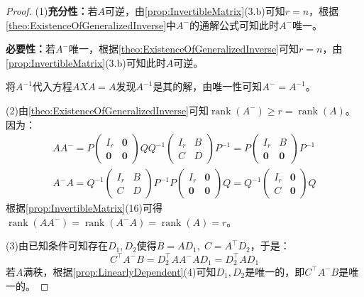 \begin{proof}
	(1)\textbf{充分性：}若$A$可逆，由\cref{prop:InvertibleMatrix}(3.b)可知$r=n$，根据\cref{theo:ExistenceOfGeneralizedInverse}中$A^-$的通解公式可知此时$A^-$唯一。\par
	\textbf{必要性：}若$A^-$唯一，根据\cref{theo:ExistenceOfGeneralizedInverse}可知$r=n$，由\cref{prop:InvertibleMatrix}(3.b)可知此时$A$可逆。\par
	将$A^{-1}$代入方程$AXA=A$发现$A^{-1}$是其的解，由唯一性可知$A^{-}=A^{-1}$。\par
	(2)由\cref{theo:ExistenceOfGeneralizedInverse}可知$\operatorname{rank}(A^-)\geqslant r=\operatorname{rank}(A)$。因为：
	\begin{gather*}
		AA^-=P
		\begin{pmatrix}
			I_r & \mathbf{0} \\
			\mathbf{0} & \mathbf{0}
		\end{pmatrix}
		QQ^{-1}
		\begin{pmatrix}
			I_r & B \\
			C & D
		\end{pmatrix}
		P^{-1}
		=P
		\begin{pmatrix}
			I_r & B \\
			\mathbf{0} & \mathbf{0}
		\end{pmatrix}
		P^{-1} \\
		A^-A=Q^{-1}
		\begin{pmatrix}
			I_r & B \\
			C & D
		\end{pmatrix}
		P^{-1}P
		\begin{pmatrix}
			I_r & \mathbf{0} \\
			\mathbf{0} & \mathbf{0}
		\end{pmatrix}
		Q
		=Q^{-1}
		\begin{pmatrix}
			I_r & \mathbf{0} \\
			C & \mathbf{0}
		\end{pmatrix}
		Q
	\end{gather*}
	根据\cref{prop:InvertibleMatrix}(16)可得$\operatorname{rank}(AA^-)=\operatorname{rank}(A^-A)=\operatorname{rank}(A)=r$。\par
	(3)由已知条件可知存在$D_1,D_2$使得$B=AD_1,\;C=A^{\top}D_2$，于是：
	\begin{equation*}
		C^{\top}A^-B=D_2^{\top}AA^-AD_1=D_2^{\top}AD_1
	\end{equation*}
	若$A$满秩，根据\cref{prop:LinearlyDependent}(4)可知$D_1,D_2$是唯一的，即$C^{\top}A^-B$是唯一的。\par

\end{proof}
